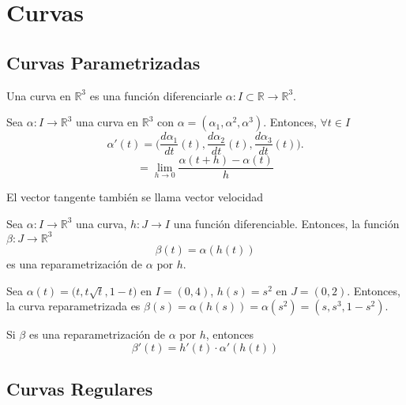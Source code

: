 \chapter{Curvas}
\section{Curvas Parametrizadas}

\begin{defn}[Curva]
  Una curva en $\mathbb{R}^{3}$ es una función diferenciarle $\alpha: I \subset \mathbb{R} \to \mathbb{R}^{3}$.
\end{defn}

\begin{defn}
  Sea $\alpha: I \to \mathbb{R}^{3}$ una curva en $\mathbb{R}^{3}$ con $\alpha = (\alpha_{1}, \alpha^{2}, \alpha^{3})$. Entonces, $\forall t \in I$
  \[ 
    \alpha'(t) = \Big ( \frac{d{\alpha_{1}}}{d{t}}(t),\frac{d{\alpha_{2}}}{d{t}}(t),\frac{d{\alpha_{3}}}{d{t}}(t) \Big ).
  \] 
  \[ 
    = \lim_{h \to 0} \frac{\alpha(t+ h) - \alpha(t)}{h} 
  \] 
\end{defn}

\begin{obs}
  El vector tangente también se llama vector velocidad
\end{obs}

\begin{defn}[Reparametrización]
  Sea $\alpha: I \to \mathbb{R}^{3}$ una curva, $h: J \to I$ una función diferenciable. Entonces, la función $\beta: J \to \mathbb{R}^{3}$
  \[ 
    \beta(t) = \alpha(h(t)) 
  \] 
  es una reparametrización de $\alpha$ por $h$.
\end{defn}

\begin{ejm}
  Sea $\alpha(t) = \big ( t , t \sqrt{t}, 1-t \big )$ en $I = (0,4)$, $h(s) = s^{2}$ en $J = ( 0,2 )$. Entonces, la curva reparametrizada es $\beta(s) = \alpha(h(s)) = \alpha(s^{2}) = ( s, s^{3}, 1 -s^{2} )$.
\end{ejm}

\begin{lem}
  Si $\beta$ es una reparametrización de $\alpha$ por $h$, entonces
  \[ 
    \beta'(t) = h'(t)\cdot \alpha'(h(t)) 
  \] 
\end{lem}

\section{Curvas Regulares}

